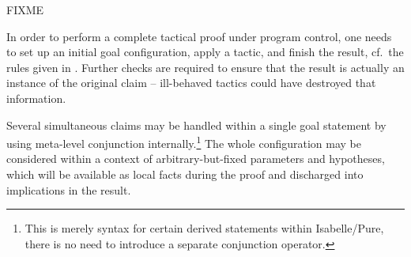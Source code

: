 \begin{isabellebody}
\begin{isamarkuptext}
%
\end{isamarkuptext}%
\isamarkuptrue%
%
\isamarkuptrue%
%
\begin{isamarkuptext}%
FIXME

%
\end{isamarkuptext}%
\isamarkuptrue%
%
\isamarkuptrue%
%
\begin{isamarkuptext}%
In order to perform a complete tactical proof under program control,
  one needs to set up an initial goal configuration, apply a tactic,
  and finish the result, cf.\ the rules given in
  .  Further checks are required to ensure
  that the result is actually an instance of the original claim --
  ill-behaved tactics could have destroyed that information.

  Several simultaneous claims may be handled within a single goal
  statement by using meta-level conjunction internally.\footnote{This
  is merely syntax for certain derived statements within
  Isabelle/Pure, there is no need to introduce a separate conjunction
  operator.}  The whole configuration may be considered within a
  context of arbitrary-but-fixed parameters and hypotheses, which will
  be available as local facts during the proof and discharged into
  implications in the result.


\end{isamarkuptext}
\end{isabellebody}
